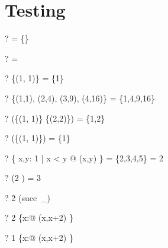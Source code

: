 \documentclass{article}
\begin{document}
\section{Testing \ran}
\begin{zed} \vdash? \ran \emptyset[\nat \cross \num] = \{\} \end{zed}
\begin{zed} \vdash? \ran \emptyset[\nat \cross \power\nat] = \emptyset \end{zed}
\begin{zed} \vdash? \ran \{(1, 1)\} = \{1\} \end{zed}
\begin{zed} \vdash? \ran \{(1,1), (2,4), (3,9), (4,16)\} = \{1,4,9,16\} \end{zed}
\begin{zed} \vdash? \ran (\{(1, 1)\} \cup \{(2,2)\}) = \{1,2\} \end{zed}
\begin{zed} \vdash? \ran (\emptyset \cup \{(1, 1)\}) = \{1\} \end{zed}
\begin{zed} \vdash? \ran \{ x,y: 1  | x < y @ (x,y) \} = \{2,3,4,5\} = 2  \end{zed}
\begin{zed} \vdash? \ran (2   ) = 3  \end{zed}
\begin{zed} \vdash? 2 \in \ran (succ~\_) \end{zed}
\begin{zed} \vdash? 2 \in \ran \{x:\nat @ (x,x+2) \} \end{zed}
\begin{zed} \vdash? 1 \notin \ran \{x:\nat @ (x,x+2) \} \end{zed}
\end{document}
